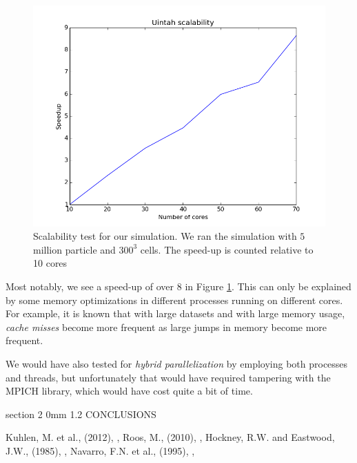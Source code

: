 \documentclass[notitlepage, 12pt]{article}
\makeatletter
\renewcommand{\section}{\@startsection       %
        {section}
        {2}
        {0mm}
        {1.2\baselineskip}
        {\baselineskip}
        {\centering\normalsize}}
\makeatother
\begin{document}
\begin{figure}[H]
\centering
\includegraphics[width=\textwidth]{Uintah/scalability2.png}
\caption{Scalability test for our simulation. We ran the simulation with $5$ million particle and $300^3$ cells. The speed-up is counted relative to 
10 cores}
\label{fig:scalability2}
\end{figure}

Most notably, we see a speed-up of over $8$ in Figure \ref{fig:scalability2}. This can only be explained by some memory optimizations in different 
processes running on different cores. For example, it is known that with large datasets and with large memory usage, \emph{cache misses} become more frequent as 
large jumps in memory become more frequent.

We would have also tested for \emph{hybrid parallelization} by employing both processes and threads, but unfortunately that would have required 
tampering with the MPICH library, which would have cost quite a bit of time.

\section{CONCLUSIONS} \label{sec:conclusions}

\renewcommand{\refname}{REFERENCES}
\begin{thebibliography}{}
Kuhlen, M. et al., (2012),
,
Roos, M., (2010),
,
Hockney, R.W. and Eastwood, J.W., (1985),
,
Navarro, F.N. et al., (1995),
,
\end{thebibliography}
\end{document}
